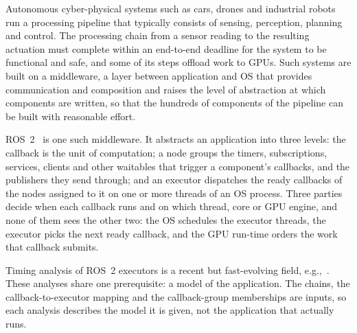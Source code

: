 
Autonomous cyber-physical systems such as cars, drones and industrial robots run a processing pipeline that typically consists of sensing, perception, planning and control. The processing chain from a sensor reading to the resulting actuation must complete within an end-to-end deadline for the system to be functional and safe, and some of its steps offload work to GPUs. Such systems are built on a middleware, a layer between application and OS that provides communication and composition and raises the level of abstraction at which components are written, so that the hundreds of components of the pipeline can be built with reasonable effort.

ROS~2~\cite{macenski-2022-ros2} is one such middleware. It abstracts an application into three levels: the callback is the unit of computation; a node groups the timers, subscriptions, services, clients and other waitables that trigger a component's callbacks, and the publishers they send through; and an executor dispatches the ready callbacks of the nodes assigned to it on one or more threads of an OS process. Three parties decide when each callback runs and on which thread, core or GPU engine, and none of them sees the other two: the OS schedules the executor threads, the executor picks the next ready callback, and the GPU run-time orders the work that callback submits.

Timing analysis of ROS~2 executors is a recent but fast-evolving field, e.g.,~\cite{casini-19-reservationbased,arafat-2026-mtexecutor-cbgroups,teper-2024-end2endmtexecutoranalysisoptimization}. These analyses share one prerequisite: a model of the application. The chains, the callback-to-executor mapping and the callback-group memberships are inputs, so each analysis describes the model it is given, not the application that actually runs.

